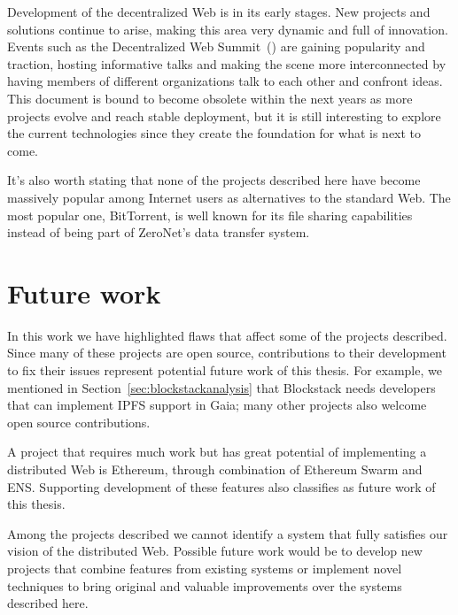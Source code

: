 \documentclass[mscthesis]{usiinfthesis}
\begin{document}
Development of the decentralized Web is in its early stages. New projects and solutions continue to arise, making this area very dynamic and full of innovation. Events such as the Decentralized Web Summit~(\cite{website:dws}) are gaining popularity and traction, hosting informative talks and making the scene more interconnected by having members of different organizations talk to each other and confront ideas. This document is bound to become obsolete within the next years as more projects evolve and reach stable deployment, but it is still interesting to explore the current technologies since they create the foundation for what is next to come.

It's also worth stating that none of the projects described here have become massively popular among Internet users as alternatives to the standard Web. The most popular one, BitTorrent, is well known for its file sharing capabilities instead of being part of ZeroNet's data transfer system.

\section{Future work}

In this work we have highlighted flaws that affect some of the projects described. Since many of these projects are open source, contributions to their development to fix their issues represent potential future work of this thesis. For example, we mentioned in Section~\ref{sec:blockstackanalysis} that Blockstack needs developers that can implement IPFS support in Gaia; many other projects also welcome open source contributions.

A project that requires much work but has great potential of implementing a distributed Web is Ethereum, through combination of Ethereum Swarm and ENS. Supporting development of these features also classifies as future work of this thesis.


Among the projects described we cannot identify a system that fully satisfies our vision of the distributed Web. Possible future work would be to develop new projects that combine features from existing systems or implement novel techniques to bring original and valuable improvements over the systems described here.


\backmatter

%
%



\end{document}
